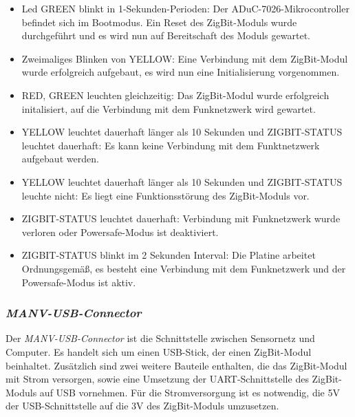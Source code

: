 \begin{itemize}
    \item{Led GREEN blinkt in 1-Sekunden-Perioden:} Der ADuC-7026-Mikrocontroller befindet sich im Bootmodus. Ein Reset des
                                                    ZigBit-Moduls wurde durchgeführt und es wird nun auf Bereitschaft des Moduls
                                                    gewartet.
    \item{Zweimaliges Blinken von YELLOW:} Eine Verbindung mit dem ZigBit-Modul wurde erfolgreich aufgebaut, es wird nun eine 
                                           Initialisierung vorgenommen.
    \item{RED, GREEN leuchten gleichzeitig:} Das ZigBit-Modul wurde erfolgreich initalisiert, auf die Verbindung mit dem 
                                                Funknetzwerk wird gewartet.
    \item{YELLOW leuchtet dauerhaft länger als 10 Sekunden und
          ZIGBIT-STATUS leuchtet dauerhaft:} Es kann keine Verbindung mit dem Funktnetzwerk aufgebaut werden.
    \item{YELLOW leuchtet dauerhaft länger als 10 Sekunden und ZIGBIT-STATUS leuchte nicht:} Es liegt eine Funktionsstörung des
          ZigBit-Moduls vor.
    \item{ZIGBIT-STATUS leuchtet dauerhaft:} Verbindung mit Funknetzwerk wurde verloren oder Powersafe-Modus ist deaktiviert.
    \item{ZIGBIT-STATUS blinkt im 2 Sekunden Interval:} Die Platine arbeitet Ordnungsgemäß, es besteht eine Verbindung mit dem
                                                        Funknetzwerk und der Powersafe-Modus ist aktiv.
\end{itemize}
                                                        
\subsubsection{\emph{MANV-USB-Connector}}

Der \emph{MANV-USB-Connector} ist die Schnittstelle zwischen Sensornetz und Computer. Es handelt sich um einen USB-Stick, der einen
ZigBit-Modul beinhaltet. Zusätzlich sind zwei weitere Bauteile enthalten, die das ZigBit-Modul mit Strom versorgen, sowie eine
Umsetzung der UART-Schnittstelle des ZigBit-Moduls auf USB vornehmen. Für die Stromversorgung ist es notwendig, die 5V der
USB-Schnittstelle auf die 3V des ZigBit-Moduls umzusetzen.

